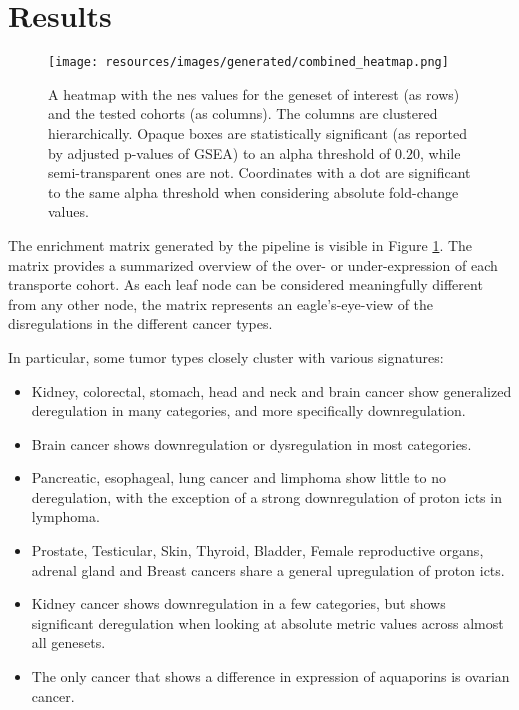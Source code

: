 \section{Results}

\begin{figure}
    \centering
    \texttt{[image: resources/images/generated/combined\_heatmap.png]}
    \caption{\small A heatmap with the \gls{nes} values for the geneset of interest (as rows) and the tested cohorts (as columns). The columns are clustered hierarchically. Opaque boxes are statistically significant (as reported by adjusted p-values of GSEA) to an alpha threshold of $0.20$, while semi-transparent ones are not. Coordinates with a dot are significant to the same alpha threshold when considering absolute fold-change values.}
    \label{fig:full_enrichment_heatmap}
\end{figure}

The enrichment matrix generated by the pipeline is visible in Figure \ref{fig:full_enrichment_heatmap}.
The matrix provides a summarized overview of the over- or under-expression of each transporte cohort.
As each leaf node can be considered meaningfully different from any other node, the matrix represents an eagle's-eye-view of the disregulations in the different cancer types.

In particular, some tumor types closely cluster with various signatures:
\begin{itemize}
    \item Kidney, colorectal, stomach, head and neck and brain cancer show generalized deregulation in many categories, and more specifically downregulation.
    \item Brain cancer shows downregulation or dysregulation in most categories.
    \item Pancreatic, esophageal, lung cancer and limphoma show little to no deregulation, with the exception of a strong downregulation of proton \glspl{ict} in lymphoma.
    \item Prostate, Testicular, Skin, Thyroid, Bladder, Female reproductive organs, adrenal gland and Breast cancers share a general upregulation of proton \glspl{ict}.
    \item Kidney cancer shows downregulation in a few categories, but shows significant deregulation when looking at absolute metric values across almost all genesets.
    \item The only cancer that shows a difference in expression of aquaporins is ovarian cancer.
\end{itemize}

